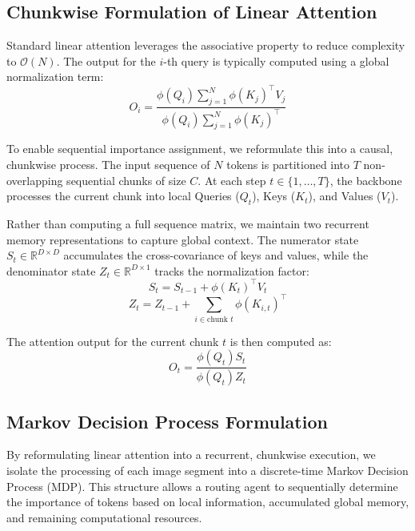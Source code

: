 \subsection{Chunkwise Formulation of Linear Attention}
Standard linear attention leverages the associative property to reduce complexity to $\mathcal{O}(N)$. The output for the $i$-th query is typically computed using a global normalization term:
\begin{equation}
    O_i = \frac{\phi(Q_i) \sum_{j=1}^N \phi(K_j)^\top V_j}{\phi(Q_i) \sum_{j=1}^N \phi(K_j)^\top}
\end{equation}

To enable sequential importance assignment, we reformulate this into a causal, chunkwise process. The input sequence of $N$ tokens is partitioned into $T$ non-overlapping sequential chunks of size $C$. At each step $t \in \{1, \dots, T\}$, the backbone processes the current chunk into local Queries ($Q_t$), Keys ($K_t$), and Values ($V_t$).

Rather than computing a full sequence matrix, we maintain two recurrent memory representations to capture global context. The numerator state $S_t \in \mathbb{R}^{D \times D}$ accumulates the cross-covariance of keys and values, while the denominator state $Z_t \in \mathbb{R}^{D \times 1}$ tracks the normalization factor:
\begin{equation}
    S_t = S_{t-1} + \phi(K_t)^\top V_t
\end{equation}
\begin{equation}
    Z_t = Z_{t-1} + \sum_{i \in \text{chunk } t} \phi(K_{i, t})^\top
\end{equation}

The attention output for the current chunk $t$ is then computed as:
\begin{equation}
    O_t = \frac{\phi(Q_t) S_t}{\phi(Q_t) Z_t}
\end{equation}

\subsection{Markov Decision Process Formulation}

By reformulating linear attention into a recurrent, chunkwise execution, we isolate the processing of each image segment into a discrete-time Markov Decision Process (MDP). This structure allows a routing agent to sequentially determine the importance of tokens based on local information, accumulated global memory, and remaining computational resources.

